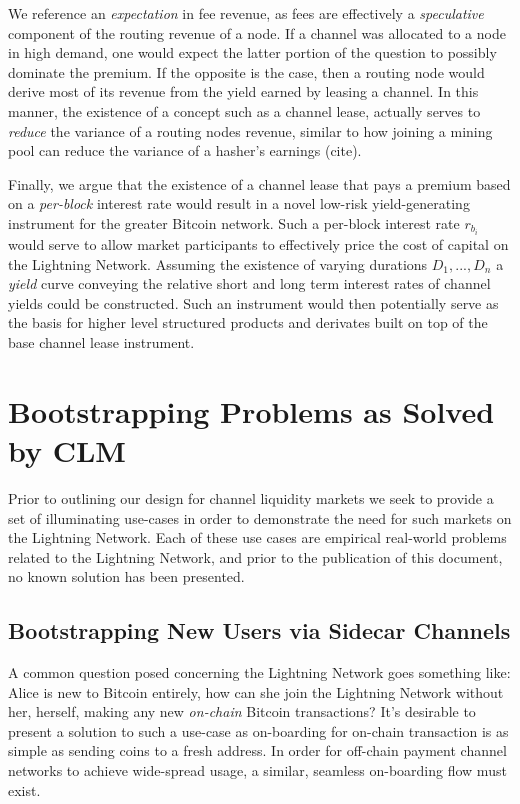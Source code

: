 \documentclass[12pt,a4paper]{article}
\theoremstyle{definition}
\begin{document}
We reference an \emph{expectation} in fee revenue, as fees are effectively a
\emph{speculative} component of the routing revenue of a node. If a channel was
allocated to a node in high demand, one would expect the latter portion of the
question to possibly dominate the premium. If the opposite is the case, then a
routing node would derive most of its revenue from the yield earned by leasing
a channel. In this manner, the existence of a concept such as a channel lease,
actually serves to \emph{reduce} the variance of a routing nodes revenue,
similar to how joining a mining pool can reduce the variance of a hasher's
earnings (cite).

Finally, we argue that the existence of a channel lease that pays a premium
based on a \emph{per-block} interest rate would result in a novel low-risk
yield-generating instrument for the greater Bitcoin network. Such a per-block
interest rate $r_{b_i}$ would serve to allow market participants to effectively
price the cost of capital on the Lightning Network. Assuming the existence of
varying durations ${D_1, ..., D_n}$ a \emph{yield} curve conveying the relative
short and long term interest rates of channel yields could be constructed. Such
an instrument would then potentially serve as the basis for higher level
structured products and derivates built on top of the base channel lease
instrument.


\section{Bootstrapping Problems as Solved by CLM}

Prior to outlining our design for channel liquidity markets we seek to provide
a set of illuminating use-cases in order to demonstrate the need for such
markets on the Lightning Network. Each of these use cases are empirical
real-world problems related to the Lightning Network, and prior to the
publication of this document, no known solution has been presented.

\subsection{Bootstrapping New Users via Sidecar Channels}

A common question posed concerning the Lightning Network goes something like:
Alice is new to Bitcoin entirely, how can she join the Lightning Network
without her, herself, making any new \emph{on-chain} Bitcoin transactions? It's
desirable to present a solution to such a use-case as on-boarding for on-chain
transaction is as simple as sending coins to a fresh address. In order for
off-chain payment channel networks to achieve wide-spread usage, a similar,
seamless on-boarding flow must exist.
\end{document}
